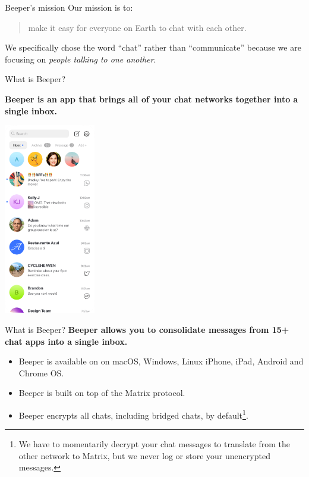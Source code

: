\documentclass{beeper}
\begin{document}
\begin{frame}{Beeper's mission}
    Our mission is to:\\

    \begin{quote}
        make it easy for everyone on Earth to chat with each other.
    \end{quote}
    \pause

    We specifically chose the word ``chat'' rather than ``communicate'' because
    we are focusing on \textit{people talking to one another}.
\end{frame}

\begin{frame}{What is Beeper?}
    \begin{center}
        \textbf{Beeper is an app that brings all of your chat networks together into
            a single inbox.}
    \end{center}
    \centerline{\includegraphics[width=0.3\textwidth]{images/beeper-mobile}}
\end{frame}

\begin{frame}{What is Beeper?}
    \textbf{Beeper allows you to consolidate messages from 15+ chat apps into a
        single inbox.}

    \pause
    \begin{itemize}
        \item Beeper is available on on macOS, Windows, Linux iPhone, iPad,
            Android and Chrome OS.
        \item Beeper is built on top of the Matrix protocol.
        \item Beeper encrypts all chats, including bridged chats, by
            default\footnote[frame]{We have to momentarily decrypt your chat
            messages to translate from the other network to Matrix, but we never
            log or store your unencrypted messages.}.
    \end{itemize}
\end{frame}
\end{document}
